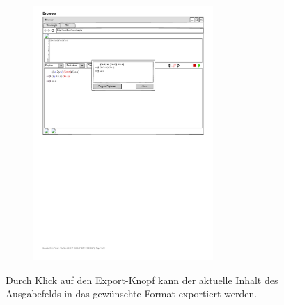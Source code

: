 \documentclass[parskip=full,11pt,twoside]{scrartcl}
\begin{document}
{\begin{figure}[H]
\begin{subfigure}{0.75\textwidth}
		\includegraphics[width=0.75\textwidth]{img/wavelength_export_window_unicode}
	\end{subfigure}
	\caption{\label{fig:export}Durch Klick auf den Export-Knopf kann der aktuelle Inhalt des Ausgabefelds in das gewünschte Format exportiert werden.}
\end{figure}


}
\end{document}
